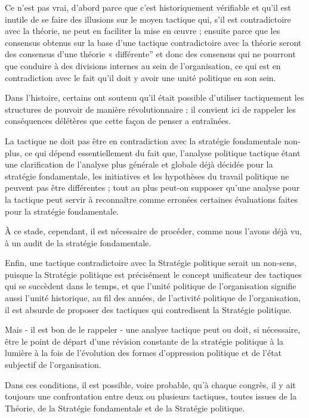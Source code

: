Ce n'est pas vrai, d'abord parce que c'est historiquement vérifiable et qu'il est inutile de se faire des illusions sur le moyen tactique qui, s'il est contradictoire avec la théorie, ne peut en faciliter la mise en œuvre ; ensuite parce que les consensus obtenus sur la base d'une tactique contradictoire avec la théorie seront des consensus d'une théorie « différente'' et donc des consensus qui ne pourront que conduire à des divisions internes au sein de l'organisation, ce qui est en contradiction avec le fait qu'il doit y avoir une unité politique en son sein.

Dans l'histoire, certains ont soutenu qu'il était possible d'utiliser tactiquement les structures de pouvoir de manière révolutionnaire ; il convient ici de rappeler les conséquences délétères que cette façon de penser a entraînées.

La tactique ne doit pas être en contradiction avec la stratégie fondamentale  non-plus, ce qui dépend essentiellement du fait que, l'analyse politique tactique étant une clarification de l'analyse plus générale et globale déjà décidée pour la stratégie fondamentale, les initiatives et les hypothèses du travail politique ne peuvent pas être différentes ; tout au plus peut-on supposer qu'une analyse pour la tactique peut servir à reconnaître comme erronées certaines évaluations faites pour la stratégie fondamentale.

À ce stade, cependant, il est nécessaire de procéder, comme nous l'avons déjà vu, à un audit de la stratégie fondamentale.

Enfin, une tactique contradictoire avec la Stratégie politique serait un non-sens, puisque la Stratégie politique est précisément le concept unificateur des tactiques qui se succèdent dans le temps, et que l'unité politique de l'organisation signifie aussi l'unité historique, au fil des années, de l'activité politique de l'organisation, il est absurde de proposer des tactiques qui contredisent la Stratégie politique.

Mais - il est bon de le rappeler - une analyse tactique peut ou doit, si nécessaire, être le point de départ d'une révision constante de la stratégie politique à la lumière à la fois de l'évolution des formes d'oppression politique et de l'état subjectif de l'organisation.

Dans ces conditions, il est possible, voire probable, qu'à chaque congrès, il y ait toujours une confrontation entre deux ou plusieurs tactiques, toutes issues de la Théorie, de la Stratégie fondamentale et de la Stratégie politique.

